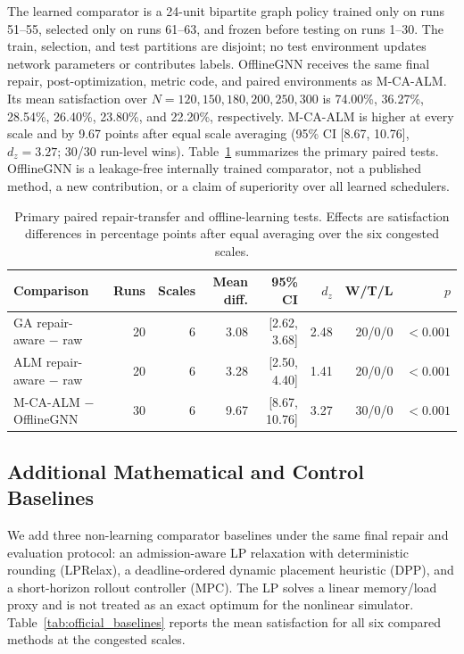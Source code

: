 The learned comparator is a 24-unit bipartite graph policy trained only on runs 51--55, selected only on runs 61--63, and frozen before testing on runs 1--30. The train, selection, and test partitions are disjoint; no test environment updates network parameters or contributes labels. OfflineGNN receives the same final repair, post-optimization, metric code, and paired environments as M-CA-ALM. Its mean satisfaction over $N=120,150,180,200,250,300$ is 74.00\%, 36.27\%, 28.54\%, 26.40\%, 23.80\%, and 22.20\%, respectively. M-CA-ALM is higher at every scale and by 9.67 points after equal scale averaging (95\% CI [8.67, 10.76], $d_z=3.27$; 30/30 run-level wins). Table~\ref{tab:transfer_learning} summarizes the primary paired tests. OfflineGNN is a leakage-free internally trained comparator, not a published method, a new contribution, or a claim of superiority over all learned schedulers.

\begin{table}[t]
\centering
\caption{Primary paired repair-transfer and offline-learning tests. Effects are satisfaction differences in percentage points after equal averaging over the six congested scales.}
\label{tab:transfer_learning}
\scriptsize
\setlength{\tabcolsep}{2.5pt}
\begin{tabular}{lrrrrrrr}
\toprule
Comparison & Runs & Scales & Mean diff. & 95\% CI & $d_z$ & W/T/L & $p$ \\
\midrule
GA repair-aware $-$ raw & 20 & 6 & 3.08 & [2.62, 3.68] & 2.48 & 20/0/0 & $<0.001$ \\
ALM repair-aware $-$ raw & 20 & 6 & 3.28 & [2.50, 4.40] & 1.41 & 20/0/0 & $<0.001$ \\
M-CA-ALM $-$ OfflineGNN & 30 & 6 & 9.67 & [8.67, 10.76] & 3.27 & 30/0/0 & $<0.001$ \\
\bottomrule
\end{tabular}
\end{table}

\subsection{Additional Mathematical and Control Baselines}
We add three non-learning comparator baselines under the same final repair and evaluation protocol: an admission-aware LP relaxation with deterministic rounding (LPRelax), a deadline-ordered dynamic placement heuristic (DPP), and a short-horizon rollout controller (MPC). The LP solves a linear memory/load proxy and is not treated as an exact optimum for the nonlinear simulator. Table~\ref{tab:official_baselines} reports the mean satisfaction for all six compared methods at the congested scales.

